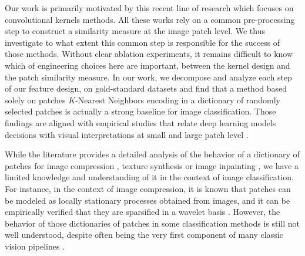 \documentclass{article}
\newcommand{\mynotes}[1]{\textcolor{red}{#1}}
\begin{document}
Our work is primarily motivated by this recent line of research which focuses on convolutional kernels methods.
All these works rely on a common pre-processing step to construct a similarity measure at the image patch level. We thus investigate to what extent this common step is responsible for the success of those methods.
Without clear ablation experiments, it remains difficult to know which of engineering choices here are important, between the kernel design and the patch similarity measure. In our work, we decompose and analyze each step of our feature design, on gold-standard datasets and find that a method based solely on patches $K$-Nearest Neighbors encoding in a dictionary of randomly selected patches is actually a strong baseline for image classification. 
Those findings are aligned with empirical studies that relate deep learning models decisions with visual interpretations at small and large patch level
\citep{zeiler2014visualizing,brendel2019approximating}.


 While the literature provides a detailed analysis of the behavior of a dictionary of patches for image compression
\citep{wallace1992jpeg}, texture synthesis \citep{efros1999texture} or image inpainting \citep{criminisi2004region}, we have a limited knowledge and understanding of it in the context of image classification. For instance, in the context of image compression, it is known that patches can be modeled as locally stationary processes obtained from images, and it can be empirically verified that they are sparsified in a wavelet basis \citep{mallat1999wavelet}. However, the behavior of those dictionaries of patches in some classification methods is still not well understood, despite often being the very first component of many classic vision pipelines \citep{perronnin2010improving,lowe2004distinctive,brendel2019approximating,oyallon2018scattering}.

\end{document}
